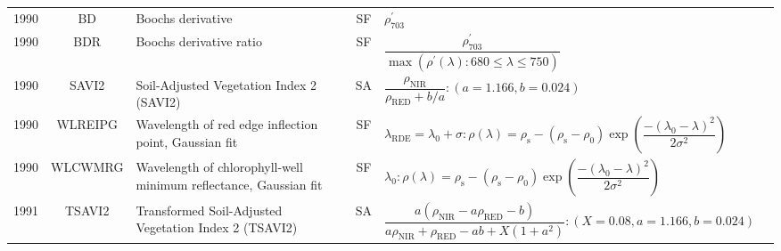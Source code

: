 \documentclass[10pt]{article}
\begin{document}
\begin{ThreePartTable}
\begin{longtable}{c c m{2.3in} c M{2.8in} M{1.5in}}
  1990 & BD      & Boochs derivative                                                              & SF & $\rho^\prime_{703}$                                                                                                                                                                                                                                                                     & \citet{Boochs1990}                                  \\
  1990 & BDR     & Boochs derivative ratio                                                        & SF & $\dfrac{\rho^\prime_{703}}{\max(\rho^\prime(\lambda):680\le\lambda\le750)}$                                                                                                                                                                                                             & \citet{Boochs1990}                                  \\
  1990 & SAVI2   & Soil-Adjusted Vegetation Index 2 (SAVI2)                                       & SA & $\dfrac{\rho_\text{NIR}}{\rho_\text{RED}+b/a}:(a=1.166,b=0.024)$                                                                                                                                                                                                                        & \citet{Major1990,Huete1984}                         \\
  1990 & WLREIPG & Wavelength of red edge inflection point, Gaussian fit                          & SF & $\lambda_\text{RDE} = \lambda_0+\sigma : \rho(\lambda) = \rho_\text{s}-(\rho_\text{s}-\rho_0)\exp\left(\dfrac{-(\lambda_0-\lambda)^2}{2\sigma^2}\right)$                                                                                                                                & \citet{Miller1990}                                  \\
  1990 & WLCWMRG & Wavelength of chlorophyll-well minimum reflectance, Gaussian fit               & SF & $\lambda_0 : \rho(\lambda) = \rho_\text{s}-(\rho_\text{s}-\rho_0)\exp\left(\dfrac{-(\lambda_0-\lambda)^2}{2\sigma^2}\right)$                                                                                                                                                            & \citet{Miller1990}                                  \\
  1991 & TSAVI2  & Transformed Soil-Adjusted Vegetation Index 2 (TSAVI2)                          & SA & $\dfrac{a(\rho_\text{NIR}-a\rho_\text{RED}-b)}{a\rho_\text{NIR}+\rho_\text{RED}-ab+X(1+a^2)}:(X=0.08,a=1.166,b=0.024)$                                                                                                                                                                  & \citet{Baret1991,Huete1984}                         \\

\end{longtable}
\end{ThreePartTable}
\end{document}
